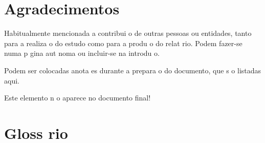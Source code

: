 \documentclass{article}
\begin{document}



\chapter*{Agradecimentos}

\begin{infoopt}
Habitualmente   mencionada a contribui o de outras pessoas ou
entidades, tanto para a realiza o do estudo como para a produ o do
relat rio. 
Podem fazer-se numa p gina aut noma ou incluir-se na introdu o.
\end{infoopt}


\renewcommand{\contentsname}{ ndice}




\listoftodos

\begin{infoopt}
Podem ser colocadas anota es durante a prepara o do documento, que
s o listadas aqui.

Este elemento n o aparece no documento final!
\end{infoopt}


\chapter*{Gloss rio}
\end{document}
